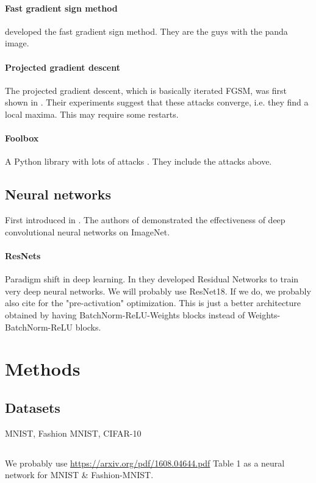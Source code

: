 \documentclass{article}
\begin{document}
\paragraph{Fast gradient sign method}
\cite{goodfellow2014explaining} developed the fast gradient sign method. They are the guys with the panda image.

\paragraph{Projected gradient descent}
The projected gradient descent, which is basically iterated FGSM, was first shown in \cite{madry2017towards}. Their experiments suggest that these attacks converge, i.e. they find a local maxima. This may require some restarts.

\paragraph{Foolbox}
A Python library with lots of attacks \cite{rauber2017foolbox}. They include the attacks above.

\subsection{Neural networks}
First introduced in \cite{lecun1999object}. The authors of
\cite{krizhevsky2012imagenet} demonstrated the effectiveness of deep convolutional neural networks on ImageNet.

\paragraph{ResNets}
Paradigm shift in deep learning. In \cite{he2016deep} they developed Residual Networks to train very deep neural networks. We will probably use ResNet18. If we do, we probably also cite \cite{he2016identity} for the "pre-activation" optimization. This is just a better architecture obtained by having BatchNorm-ReLU-Weights blocks instead of Weights-BatchNorm-ReLU blocks.


\section{Methods}
\subsection{Datasets}
MNIST, Fashion MNIST, CIFAR-10

\subsection{}
We probably use \url{https://arxiv.org/pdf/1608.04644.pdf} Table 1 as a neural network for MNIST \& Fashion-MNIST.



\end{document}
